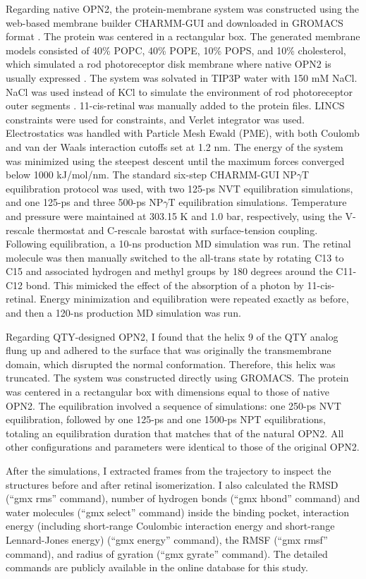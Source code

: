 \documentclass[fleqn, 10pt]{manuscript}
\begin{document}
Regarding native OPN2, the protein-membrane system was constructed using the web-based membrane builder CHARMM-GUI and downloaded in GROMACS format \citep{Jo_2008, Wu_2014, Lee_2016}. The protein was centered in a rectangular box. The generated membrane models consisted of 40\% POPC, 40\% POPE, 10\% POPS, and 10\% cholesterol, which simulated a rod photoreceptor disk membrane where native OPN2 is usually expressed \citep{Albert_2005}. The system was solvated in TIP3P water with 150 mM NaCl. NaCl was used instead of KCl to simulate the environment of rod photoreceptor outer segments \citep{Govardovskii_1971}. 11-cis-retinal was manually added to the protein files. LINCS constraints were used for constraints, and Verlet integrator was used. Electrostatics was handled with Particle Mesh Ewald (PME), with both Coulomb and van der Waals interaction cutoffs set at 1.2 nm. The energy of the system was minimized using the steepest descent until the maximum forces converged below 1000 kJ/mol/nm. The standard six-step CHARMM-GUI NP$\gamma$T equilibration protocol \citep{Jo_2008} was used, with two 125-ps NVT equilibration simulations, and one 125-ps and three 500-ps NP$\gamma$T equilibration simulations. Temperature and pressure were maintained at 303.15 K and 1.0 bar, respectively, using the V-rescale thermostat and C-rescale barostat with surface-tension coupling. Following equilibration, a 10-ns production MD simulation was run. The retinal molecule was then manually switched to the all-trans state by rotating C13 to C15 and associated hydrogen and methyl groups by 180 degrees around the C11-C12 bond. This mimicked the effect of the absorption of a photon by 11-cis-retinal. Energy minimization and equilibration were repeated exactly as before, and then a 120-ns production MD simulation was run. 

Regarding QTY-designed OPN2, I found that the helix 9 of the QTY analog flung up and adhered to the surface that was originally the transmembrane domain, which disrupted the normal conformation. Therefore, this helix was truncated. The system was constructed directly using GROMACS. The protein was centered in a rectangular box with dimensions equal to those of native OPN2. The equilibration involved a sequence of simulations: one 250-ps NVT equilibration, followed by one 125-ps and one 1500-ps NPT equilibrations, totaling an equilibration duration that matches that of the natural OPN2. All other configurations and parameters were identical to those of the original OPN2.

After the simulations, I extracted frames from the trajectory to inspect the structures before and after retinal isomerization. I also calculated the RMSD (``gmx rms'' command), number of hydrogen bonds (``gmx hbond'' command) and water molecules (``gmx select'' command) inside the binding pocket, interaction energy (including short-range Coulombic interaction energy and short-range Lennard-Jones energy) (``gmx energy'' command), the RMSF (``gmx rmsf'' command), and radius of gyration (``gmx gyrate'' command). The detailed commands are publicly available in the online database for this study. 
\end{document}
